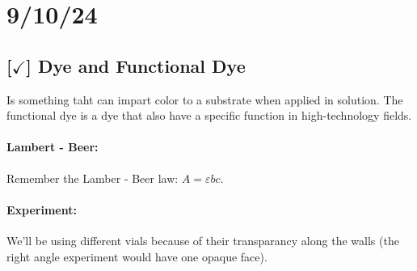 \section{9/10/24}

\subsection{[$\checkmark$] Dye and Functional Dye}

Is something taht can impart color to a substrate when applied in solution. The functional dye is a dye that also have a specific function in high-technology fields.

\paragraph{Lambert - Beer: } Remember the Lamber - Beer law: $A = \varepsilon b c$.

\paragraph{Experiment: } We'll be using different vials because of their transparancy along the walls (the right angle experiment would have one opaque face).